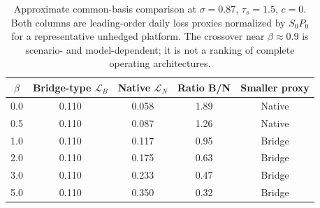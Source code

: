 \begin{table}[htbp]
\centering
\footnotesize
\caption{Approximate common-basis comparison at $\sigma=0.87$, $\tau_s=1.5$, $c=0$. Both columns are leading-order daily loss proxies normalized by $S_0P_0$ for a representative unhedged platform. The crossover near $\beta\approx0.9$ is scenario- and model-dependent; it is not a ranking of complete operating architectures.}
\label{tab:architecture_dominance}
\begin{tabular}{ccccc}
\hline
$\beta$ & Bridge-type $\mathcal{L}_B$ & Native $\mathcal{L}_N$ & Ratio B/N & Smaller proxy \\
\hline
0.0 & 0.110 & 0.058 & 1.89 & Native \\
0.5 & 0.110 & 0.087 & 1.26 & Native \\
1.0 & 0.110 & 0.117 & 0.95 & Bridge \\
2.0 & 0.110 & 0.175 & 0.63 & Bridge \\
3.0 & 0.110 & 0.233 & 0.47 & Bridge \\
5.0 & 0.110 & 0.350 & 0.32 & Bridge \\
\hline
\end{tabular}
\end{table}
